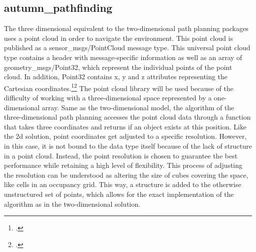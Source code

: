 \subsection{autumn\_pathfinding}
The three dimensional equivalent to the two-dimensional path planning packages uses a point cloud in order to navigate the environment. This point cloud is published as a sensor\_msgs/PointCloud message type. This universal point cloud type contains a header with message-specific information as well as an array of geometry\_msgs/Point32, which represent the individual points of the point cloud. In addition, Point32 contains x, y and z attributes representing the Cartesian coordinates.\footcite{rosGeometryMsgsPoint322021}\footcite{rosSensorMsgsPointCloud2021}\newline
The point cloud library will be used because of the difficulty of working with a three-dimensional space represented by a one-dimensional array. Same as the two-dimensional model, the algorithm of the three-dimensional path planning accesses the point cloud data through a function that takes three coordinates and returns if an object exists at this position.\newline
Like the 2d solution, point coordinates get adjusted to a specific resolution. However, in this case, it is not bound to the data type itself because of the lack of structure in a point cloud. Instead, the point resolution is chosen to guarantee the best performance while retaining a high level of flexibility. This process of adjusting the resolution can be understood as altering the size of cubes covering the space, like cells in an occupancy grid. This way, a structure is added to the otherwise unstructured set of points, which allows for the exact implementation of the algorithm as in the two-dimensional solution. 

